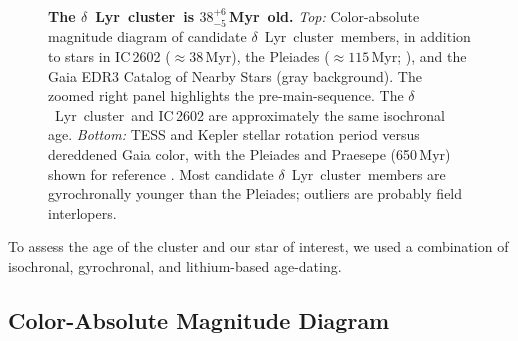 \documentclass[12pt,modern,twocolumn,tighten]{aastex63}
\newcommand{\cn}{$\delta$\ Lyr\ cluster} %
\newcommand{\clusterage}{$38^{+6}_{-5}$\,Myr} %
\begin{document}
\begin{figure}[tp]
\begin{center}
		\vspace{-0.5cm}
	\end{center}
	\vspace{-0.7cm}
	\caption{
    {\bf The \cn\ is \clusterage\ old.}  {\it Top:}
    Color-absolute magnitude diagram of candidate \cn\ members, in addition to
    stars in IC\,2602 ($\approx38$\,Myr), the Pleiades ($\approx
    115$\,Myr; \citealt{dahm_2015}), and the Gaia EDR3 Catalog of
    Nearby Stars (gray background).  The zoomed right panel
    highlights the pre-main-sequence.  The \cn\ and IC\,2602 are
    approximately the same isochronal age.  {\it Bottom:} TESS and
    Kepler stellar rotation period versus dereddened Gaia color,
    with the Pleiades and Praesepe (650\,Myr) shown for reference
    \citep{rebull_rotation_2016a,douglas_poking_2017}.  Most
    candidate \cn\ members are gyrochronally younger than the
    Pleiades; outliers are probably field interlopers.
   \label{fig:age}
	}
\end{figure}

To assess the age of the cluster and our star of interest, we used a
combination of isochronal, gyrochronal, and lithium-based
age-dating.

\subsection{Color-Absolute Magnitude Diagram}
\label{sec:camd}
\end{document}
